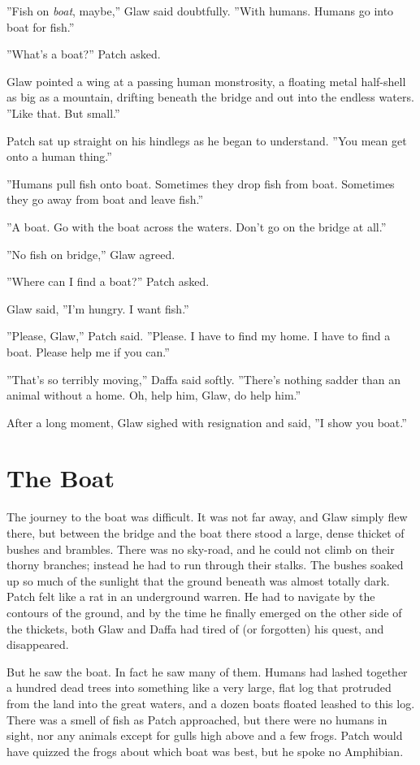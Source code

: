 \documentclass[12pt]{book}
\begin{document}
''Fish on {\it boat}, maybe,'' Glaw said doubtfully. ''With humans. Humans go into boat for fish.''

''What's a boat?'' Patch asked.

Glaw pointed a wing at a passing human monstrosity, a floating metal half-shell as big as a mountain, drifting beneath the bridge and out into the endless waters. ''Like that. But small.''

Patch sat up straight on his hindlegs as he began to understand. ''You mean get onto a human thing.''

''Humans pull fish onto boat. Sometimes they drop fish from boat. Sometimes they go away from boat and leave fish.''

''A boat. Go with the boat across the waters. Don't go on the bridge at all.''

''No fish on bridge,'' Glaw agreed.

''Where can I find a boat?'' Patch asked.

Glaw said, ''I'm hungry. I want fish.''

''Please, Glaw,'' Patch said. ''Please. I have to find my home. I have to find a boat. Please help me if you can.''

''That's so terribly moving,'' Daffa said softly. ''There's nothing sadder than an animal without a home. Oh, help him, Glaw, do help him.''

After a long moment, Glaw sighed with resignation and said, ''I show you boat.''


\section{The Boat}

The journey to the boat was difficult. It was not far away, and Glaw simply flew there, but between the bridge and the boat there stood a large, dense thicket of bushes and brambles. There was no sky-road, and he could not climb on their thorny branches; instead he had to run through their stalks. The bushes soaked up so much of the sunlight that the ground beneath was almost totally dark. Patch felt like a rat in an underground warren. He had to navigate by the contours of the ground, and by the time he finally emerged on the other side of the thickets, both Glaw and Daffa had tired of (or forgotten) his quest, and disappeared.

But he saw the boat. In fact he saw many of them. Humans had lashed together a hundred dead trees into something like a very large, flat log that protruded from the land into the great waters, and a dozen boats floated leashed to this log. There was a smell of fish as Patch approached, but there were no humans in sight, nor any animals except for gulls high above and a few frogs. Patch would have quizzed the frogs about which boat was best, but he spoke no Amphibian.
\end{document}
